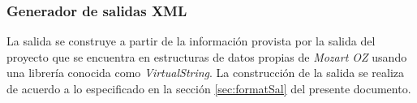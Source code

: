 \subsubsection{Generador de salidas XML}

La salida se construye a partir de la información provista por la salida del proyecto que se encuentra en estructuras de datos propias de \textit{Mozart OZ} usando una librería conocida como \textit{VirtualString}.
La construcción de la salida se realiza de acuerdo a lo especificado en la sección \ref{sec:formatSal} del presente documento. 
